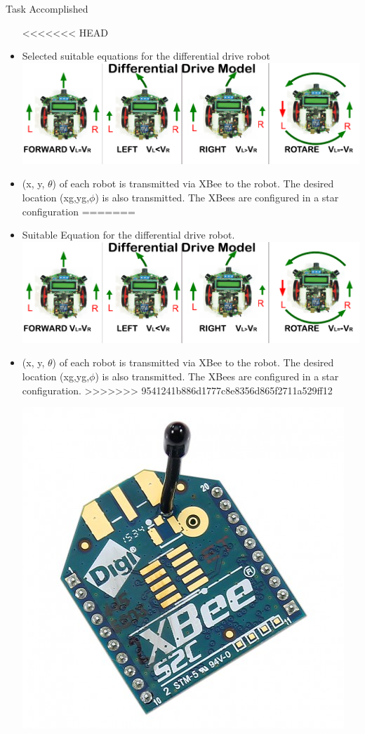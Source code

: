 \documentclass[11pt, a4paper]{beamer}
\begin{document}
\begin{frame}{Task Accomplished}
\begin{itemize}

<<<<<<< HEAD
		\item Selected suitable equations for the differential drive robot\\
		\includegraphics[scale =.4]{images/ddrive.jpg}
		\item (x, y, $\theta$) of each robot is transmitted via XBee to the robot. The desired location (xg,yg,$\phi$) is also transmitted. The XBees are configured in a star configuration
=======
		\item Suitable Equation for the differential drive robot. \\
		\includegraphics[scale =.40]{images/ddrive.jpg}
		\item (x, y, $\theta$) of each robot is transmitted via XBee to the robot. The desired location (xg,yg,$\phi$) is also transmitted. The XBees are configured in a star configuration. 
>>>>>>> 9541241b886d1777c8e8356d865f2711a529ff12
		\\ \begin{center}
			\includegraphics[scale =.12]{images/xbee.jpg}

\end{center}
\end{itemize}
\end{frame}
\end{document}
